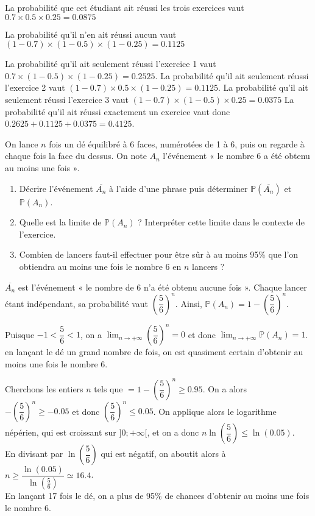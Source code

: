 \documentclass[11pt,fleqn, openany]{book} %
\begin{document}
\begin{solution}La probabilité que cet étudiant ait réussi les trois exercices vaut $0.7  \times 0.5 \times 0.25 = 0.0875$

La probabilité qu'il n'en ait réussi aucun vaut $(1-0.7)\times(1-0.5) \times (1-0.25)=0.1125$

La probabilité qu'il ait seulement réussi l'exercice 1 vaut $0.7 \times (1-0.5) \times (1-0.25)=0.2525$. La probabilité qu'il ait seulement réussi l'exercice 2 vaut $(1-0.7) \times 0.5 \times (1-0.25)=0.1125$.  La probabilité qu'il ait seulement réussi l'exercice 3 vaut $(1-0.7) \times (1-0.5) \times 0.25=0.0375$ La probabilité qu'il ait réussi exactement un exercice vaut donc $0.2625+0.1125+0.0375=0.4125$. \end{solution}




\begin{exercise}[topic=prob11]On lance $n$ fois un dé équilibré à 6 faces, numérotées de 1 à 6, puis on regarde à chaque fois la face du dessus. On note $A_n$ l'événement « le nombre 6 a été obtenu au moins une fois ».
\begin{enumerate}
\item Décrire l'événement $\overline{A_n}$ à l'aide d'une phrase puis déterminer $\mathbb{P}(\overline{A_n})$ et $\mathbb{P}(A_n)$. 
\item Quelle est la limite de $\mathbb{P}(A_n)$ ? Interpréter cette limite dans le contexte de l'exercice.
\item Combien de lancers faut-il effectuer pour être sûr à au moins 95\% que l'on obtiendra au moins une fois le nombre 6 en $n$ lancers ?
\end{enumerate}\end{exercise}


\begin{solution}$\overline{A_n}$ est l'événement « le nombre de 6 n'a été obtenu aucune fois ». Chaque lancer étant indépendant, sa probabilité vaut $\left(\dfrac{5}{6}\right)^n$. Ainsi, 
$\mathbb{P}(A_n)=1-\left(\dfrac{5}{6}\right)^n$.

Puisque $-1< \dfrac{5}{6} < 1$, on a $\displaystyle\lim_{n \to +\infty} \left(\dfrac{5}{6}\right)^n=0$ et donc $\displaystyle\lim_{n \to +\infty}\mathbb{P}(A_n)=1$. en lançant le dé un grand nombre de fois, on est quasiment certain d'obtenir au moins une fois le nombre 6.

Cherchons les entiers $n$ tels que $=1-\left(\dfrac{5}{6}\right)^n \geqslant 0.95$. On a alors $-\left(\dfrac{5}{6}\right)^n \geqslant -0.05$ et donc $\left(\dfrac{5}{6}\right)^n \leqslant 0.05$. On applique alors le logarithme népérien, qui est croissant sur $]0;+\infty[$, et on a donc $n \ln \left(\dfrac{5}{6}\right) \leqslant \ln(0.05)$. \\En divisant par $\ln\left(\dfrac{5}{6}\right)$ qui est négatif, on aboutit alors à $n \geqslant \dfrac{\ln(0.05)}{\ln\left(\frac{5}{6}\right)}\simeq 16.4$. \\En lançant 17 fois le dé, on a plus de 95\% de chances d'obtenir au moins une fois le nombre 6.\end{solution}
\end{document}
